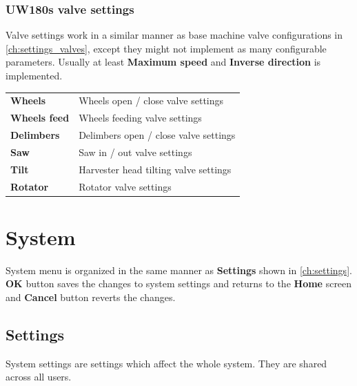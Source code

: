 \documentclass[12pt,a4paper,english]{uvmanual}
\begin{document}
\FloatBarrier
\subsection{UW180s valve settings}\label{ch:settings_uw180s_valves}

Valve settings work in a similar manner as base machine valve configurations in \autoref{ch:settings_valves}, except they might not implement as many configurable parameters. Usually at least \textbf{Maximum speed} and \textbf{Inverse direction} is implemented.


\begin{tabular}{ L{0.2\textwidth} L{0.66\textwidth} }
\textbf{Wheels} & Wheels open / close valve settings \\
\textbf{Wheels feed} & Wheels feeding valve settings \\
\textbf{Delimbers} & Delimbers open / close valve settings \\
\textbf{Saw} & Saw in / out valve settings \\
\textbf{Tilt} & Harvester head tilting valve settings \\
\textbf{Rotator} & Rotator valve settings \\
\end{tabular}

\chapter{System}\label{ch:system}

System menu is organized in the same manner as \textbf{Settings} shown in \autoref{ch:settings}. \textbf{OK} button saves the changes to system settings and returns to the \textbf{Home} screen and \textbf{Cancel} button reverts the changes.

\section{Settings}\label{ch:system_settings}

System settings are settings which affect the whole system. They are shared across all users.


\end{document}
